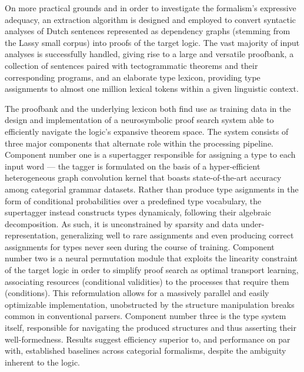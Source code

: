 On more practical grounds and in order to investigate the formalism's expressive adequacy, an extraction algorithm is designed and employed to convert syntactic analyses of Dutch sentences represented as dependency graphs (stemming from the Lassy small corpus) into proofs of the target logic.
The vast majority of input analyses is successfully handled, giving rise to a large and versatile proofbank, a collection of sentences paired with tectogrammatic theorems and their corresponding programs, and an elaborate type lexicon, providing type assignments to almost one million lexical tokens within a given linguistic context.

The proofbank and the underlying lexicon both find use as training data in the design and implementation of a neurosymbolic proof search system able to efficiently navigate the logic's expansive theorem space.
The system consists of three major components that alternate role within the processing pipeline.
Component number one is a supertagger responsible for assigning a type to each input word — the tagger is formulated on the basis of a hyper-efficient heterogeneous graph convolution kernel that boasts state-of-the-art accuracy among categorial grammar datasets.
Rather than produce type asignments in the form of conditional probabilities over a predefined type vocabulary, the supertagger instead constructs types dynamicaly, following their algebraic decomposition.
As such, it is unconstrained by sparsity and data under-representation, generalizing well to rare assignments and even producing correct assignments for types never seen during the course of training.
Component number two is a neural permutation module that exploits the linearity constraint of the target logic in order to simplify proof search as optimal transport learning, associating resources (conditional validities) to the processes that require them (conditions).
This reformulation allows for a massively parallel and easily optimizable implementation, unobstructed by the structure manipulation breaks common in conventional parsers.
Component number three is the type system itself, responsible for navigating the produced structures and thus asserting their well-formedness.
Results suggest efficiency superior to, and performance on par with, established baselines across categorial formalisms, despite the ambiguity inherent to the logic.


